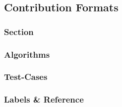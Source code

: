 \documentclass[../alan-handbook.tex]{subfiles}
\begin{document}
\subsection{Contribution Formats}

\subsubsection{Section}

\subsubsection{Algorithms}

\subsubsection{Test-Cases}

\subsubsection{Labels \& Reference}
\end{document}
